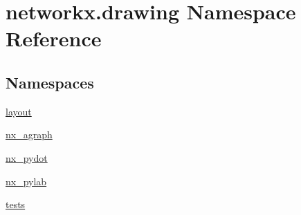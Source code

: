 \hypertarget{namespacenetworkx_1_1drawing}{}\section{networkx.\+drawing Namespace Reference}
\label{namespacenetworkx_1_1drawing}
\subsection*{Namespaces}
\begin{DoxyCompactItemize}
\item 
 \hyperlink{namespacenetworkx_1_1drawing_1_1layout}{layout}
\item 
 \hyperlink{namespacenetworkx_1_1drawing_1_1nx__agraph}{nx\+\_\+agraph}
\item 
 \hyperlink{namespacenetworkx_1_1drawing_1_1nx__pydot}{nx\+\_\+pydot}
\item 
 \hyperlink{namespacenetworkx_1_1drawing_1_1nx__pylab}{nx\+\_\+pylab}
\item 
 \hyperlink{namespacenetworkx_1_1drawing_1_1tests}{tests}
\end{DoxyCompactItemize}
